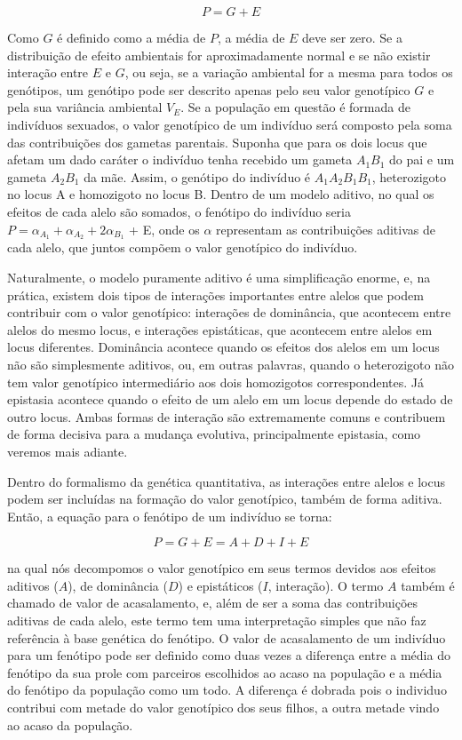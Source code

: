 \begin{refsection}
\begin{equation}
P = G + E
\end{equation}

Como $G$ é definido como a média de $P$, a média de $E$ deve ser zero. Se a
distribuição de efeito ambientais for aproximadamente normal e se não existir
interação entre $E$ e $G$, ou seja, se a variação ambiental for a mesma para
todos os genótipos, um genótipo pode ser descrito apenas pelo seu valor
genotípico $G$ e pela sua variância ambiental $V_E$. Se a população em questão
é formada de indivíduos sexuados, o valor genotípico de um indivíduo será
composto pela soma das contribuições dos gametas parentais. Suponha que para os dois
locus que afetam um dado caráter o indivíduo tenha recebido um gameta $A_1B_1$
do pai e um gameta $A_2B_1$ da mãe. Assim, o genótipo do indivíduo é
$A_1A_2B_1B_1$, heterozigoto no locus A e homozigoto no locus B. Dentro de um
modelo aditivo, no qual os efeitos de cada alelo são somados, o fenótipo do
indivíduo seria $P = \alpha_{A_1} + \alpha_{A_2} + 2\alpha_{B_1}$ + E, onde os
$\alpha$ representam as contribuições aditivas de cada alelo, que juntos
compõem o valor genotípico do indivíduo. 

Naturalmente, o modelo puramente aditivo é uma simplificação enorme, e, na
prática, existem dois tipos de interações importantes entre alelos que podem
contribuir com o valor genotípico: interações de dominância, que acontecem
entre alelos do mesmo locus, e interações epistáticas, que acontecem entre
alelos em locus diferentes. Dominância acontece quando os efeitos dos alelos
em um locus não são simplesmente aditivos, ou, em outras palavras, quando o
heterozigoto não tem valor genotípico intermediário aos dois homozigotos
correspondentes. Já epistasia acontece quando o efeito de um alelo em um locus
depende do estado de outro locus. Ambas formas de interação são extremamente
comuns e contribuem de forma decisiva para a mudança evolutiva, principalmente
epistasia, como veremos mais adiante.

Dentro do formalismo da genética quantitativa, as interações entre alelos e
locus podem ser incluídas na formação do valor genotípico, também de forma
aditiva. Então, a equação para o fenótipo de um indivíduo se torna:

\begin{equation}
P = G + E = A + D + I + E
\end{equation}

na qual nós decompomos o valor genotípico em seus termos devidos aos efeitos
aditivos ($A$), de dominância ($D$) e epistáticos ($I$, interação). O termo
$A$ também é chamado de valor de acasalamento, e, além de ser a soma das
contribuições aditivas de cada alelo, este termo tem uma interpretação simples
que não faz referência à base genética do fenótipo. O valor de acasalamento de
um indivíduo para um fenótipo pode ser definido como duas vezes a diferença
entre a média do fenótipo da sua prole com parceiros escolhidos ao acaso na
população e a média do fenótipo da população como um todo. A diferença é
dobrada pois o individuo contribui com metade do valor genotípico dos seus
filhos, a outra metade vindo ao acaso da população.


\end{refsection}
